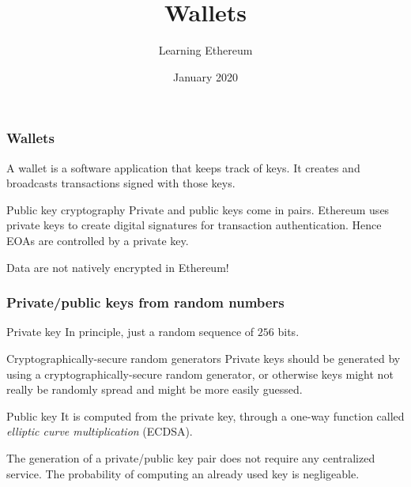 \documentclass[11pt]{beamer}  %
\subtitle{Learning Ethereum}
\title{Wallets}
\institute{Universit\`a di Verona, Italy}
\date{January 2020}
\begin{document}
\begin{frame}
  \titlepage
\end{frame}

\begin{frame}
  \frametitle{Wallets}

  \begin{greenbox}{}
    A wallet is a software application that keeps track of keys.
    It creates and broadcasts transactions signed with those keys.
  \end{greenbox}

  \bigskip

  \begin{greenbox}{Public key cryptography}
    Private and public keys come in pairs.
    Ethereum uses private keys to create
    digital signatures for transaction authentication.
    Hence EOAs are controlled by a private key.
  \end{greenbox}

  \bigskip

  \begin{redbox}{}
    Data are not natively encrypted in Ethereum!
  \end{redbox}

\end{frame}

\begin{frame}\frametitle{Private/public keys from random numbers}

  \begin{greenbox}{Private key}
    In principle, just a random sequence of $256$ bits.
  \end{greenbox}

  \bigskip

  \begin{redbox}{Cryptographically-secure random generators}
    Private keys should be generated by using a cryptographically-secure
    random generator, or otherwise keys might not really be randomly
    spread and might be more easily guessed.
  \end{redbox}

  \bigskip

  \begin{greenbox}{Public key}
    It is computed from the private key, through a one-way function
    called \emph{elliptic curve multiplication} (ECDSA).
  \end{greenbox}

  \begin{center}
    The generation of a private/public key pair does not require any
    centralized service. The probability of computing an already used key
    is negligeable.
  \end{center}

\end{frame}
\end{document}
